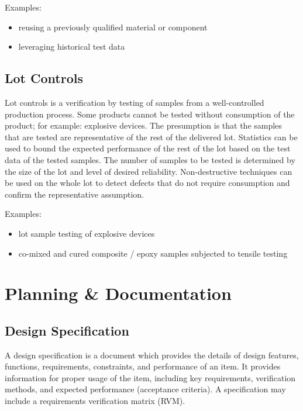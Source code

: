 \documentclass[12pt]{article}
\begin{document}
Examples: 
\begin{itemize}
\item reusing a previously qualified material or component
\item leveraging historical test data 
\end{itemize}

\subsection{Lot Controls}
Lot controls is a verification by testing of samples from a well-controlled production process. 
Some products cannot be tested without consumption of the product; for example: explosive devices. 
The presumption is that the samples that are tested are representative of the rest of the delivered lot. 
Statistics can be used to bound the expected performance of the rest of the lot based on the test data of the tested samples. 
The number of samples to be tested is determined by the size of the lot and level of desired reliability. 
Non-destructive techniques can be used on the whole lot to detect defects that do not require consumption and confirm the representative assumption.

Examples: 
\begin{itemize}
\item lot sample testing of explosive devices
\item co-mixed and cured composite / epoxy samples subjected to tensile testing
\end{itemize}

\section{Planning \& Documentation}

\subsection{Design Specification}
A design specification is a document which provides the details of design features, functions, requirements, constraints, and performance of an item.
It provides information for proper usage of the item, including key requirements, verification methods, and expected performance (acceptance criteria). A specification may include a requirements verification matrix (RVM).
\end{document}

